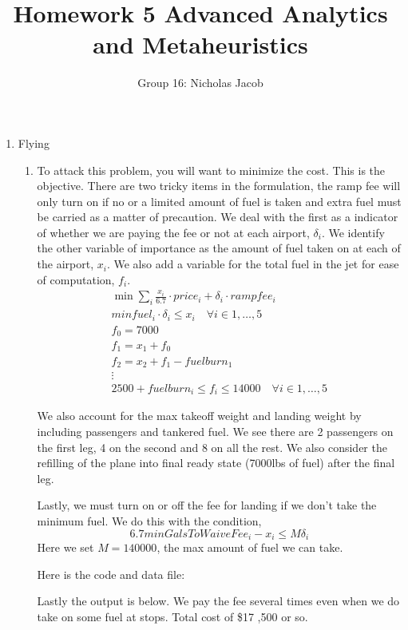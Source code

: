 \documentclass[11pt]{article}
\author{Group 16: Nicholas Jacob}
\title{Homework 5 Advanced Analytics and Metaheuristics}
\begin{document}
\maketitle

\begin{enumerate}
\item Flying
\begin{enumerate}
\item To attack this problem, you will want to minimize the cost.  This is the objective.  There are two tricky items in the formulation, the ramp fee will only turn on if no or a limited amount of fuel is taken and extra fuel must be carried as a matter of precaution.  We deal with the first as a indicator of whether we are paying the fee or not at each airport, $\delta_i$.  We identify the other variable of importance as the amount of fuel taken on at each of the airport, $x_i$.  We also add a variable for the total fuel in the jet for ease of computation, $f_i$.
\begin{eqnarray}
\min \sum_{i}\frac{x_i}{6.7}\cdot price_i + \delta_i\cdot rampfee_i\\
minfuel_i\cdot\delta_i\leq x_i\quad \forall i\in {1,\dots ,5}\\
f_0 = 7000\\
f_1 = x_1 + f_0\\
f_2 = x_2 + f_1 - fuelburn_1\\
\vdots\\
2500 + fuelburn_i \leq f_i \leq 14000\quad \forall i \in {1,\dots ,5}
\end{eqnarray}

We also account for the max takeoff weight and landing weight by including passengers and tankered fuel.  We see there are 2 passengers on the first leg, 4 on the second and 8 on all the rest.  We also consider the refilling of the plane into final ready state (7000lbs of fuel) after the final leg.

Lastly, we must turn on or off the fee for landing if we don't take the minimum fuel.  We do this with the condition,
\[
6.7minGalsToWaiveFee_i - x_i\leq M\delta_i
\]
Here we set $M = 140000$, the max amount of fuel we can take.

Here is the code and data file:


{\tiny {}}


{\tiny {}}

Lastly the output is below.  We pay the fee several times even when we do take on some fuel at stops.  Total cost of \$17 ,500 or so.


\end{enumerate}
\end{enumerate}
\end{document}
